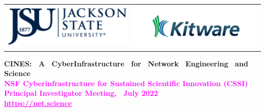 \documentclass[landscape,paperwidth=70in,paperheight=46in,fontscale=0.225]{baposter} %
\begin{document}
\begin{poster}
{\begin{tabular}{c c}
\includegraphics[scale=0.4]{logos/jsu.png} &
\includegraphics[scale=0.4]{logos/kitware.png} \\
\end{tabular}
}
{\textbf{CINES:~ A~ CyberInfrastructure~ for~ Network~ Engineering~ and~ Science} \\
\vspace{-3mm}
{
           \textcolor{magenta}{%
               {\textbf{\Large{NSF Cyberinfrastructure for Sustained Scientific Innovation (CSSI) Principal Investigator Meeting,~ July 2022}}}} \\
               \vspace{2.5mm}
                 \textbf{\Large{\textcolor{magenta}{\underline{https://net.science}}}}            
            } }%
            

\end{poster}
\end{document}
